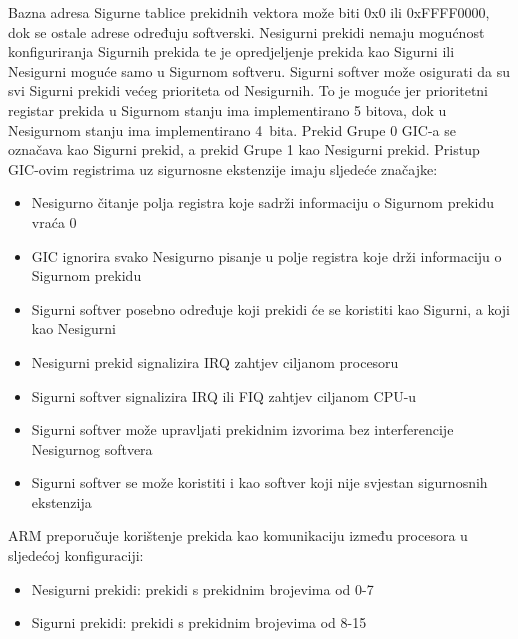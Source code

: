 \documentclass[times, utf8, diplomski, numeric]{fer}
\begin{document}
Bazna adresa Sigurne tablice prekidnih vektora može biti 0x0 ili 0xFFFF0000, dok se ostale adrese određuju softverski.
Nesigurni prekidi nemaju mogućnost konfiguriranja Sigurnih prekida te je opredjeljenje prekida kao Sigurni ili Nesigurni
moguće samo u Sigurnom softveru. Sigurni softver može osigurati da su svi Sigurni prekidi većeg prioriteta od Nesigurnih.
To je moguće jer prioritetni registar prekida u Sigurnom stanju ima implementirano 5 bitova, dok u Nesigurnom stanju ima
implementirano 4~bita.
Prekid Grupe 0 GIC-a se označava kao Sigurni prekid, a prekid Grupe 1 kao Nesigurni prekid. Pristup GIC-ovim registrima uz
sigurnosne ekstenzije imaju sljedeće značajke:
\begin{itemize}
  \item{Nesigurno čitanje polja registra koje sadrži informaciju o Sigurnom prekidu vraća 0}
  \item{GIC ignorira svako Nesigurno pisanje u polje registra koje drži informaciju o Sigurnom prekidu}
  \item{Sigurni softver posebno određuje koji prekidi će se koristiti kao Sigurni, a koji kao Nesigurni}
  \item{Nesigurni prekid signalizira IRQ zahtjev ciljanom procesoru}
  \item{Sigurni softver signalizira IRQ ili FIQ zahtjev ciljanom CPU-u}
  \item{Sigurni softver može upravljati prekidnim izvorima bez interferencije Nesigurnog softvera}
  \item{Sigurni softver se može koristiti i kao softver koji nije svjestan sigurnosnih ekstenzija}
\end{itemize}
ARM preporučuje korištenje prekida kao komunikaciju između procesora u sljedećoj konfiguraciji:
\begin{itemize}
  \item{Nesigurni prekidi: prekidi s prekidnim brojevima od 0-7}
  \item{Sigurni prekidi: prekidi s prekidnim brojevima od 8-15}
\end{itemize}
\end{document}
